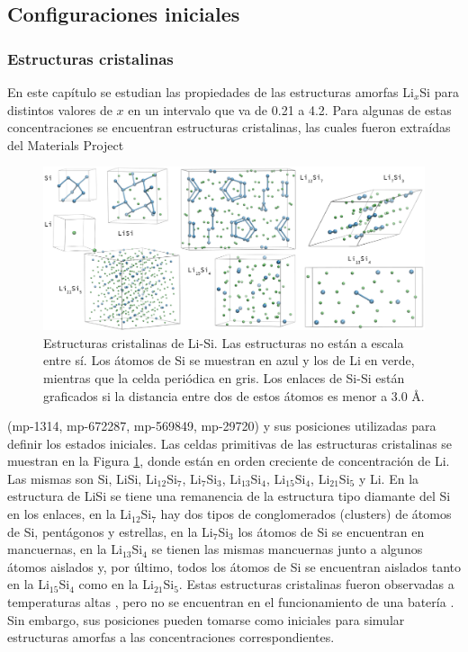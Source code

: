 \subsection{Configuraciones iniciales}

\subsubsection{Estructuras cristalinas}

En este capítulo se estudian las propiedades de las estructuras amorfas Li$_x$Si
para distintos valores de $x$ en un intervalo que va de 0.21 a 4.2. Para algunas de
estas concentraciones se encuentran estructuras cristalinas, las cuales 
fueron extraídas del Materials Project \cite{materials_project} 
\begin{figure}[h!]
    \centering
    \includegraphics[width=\textwidth]{Silicio/caracterizacion/metodos/config/cristalinas.png}
    \caption{Estructuras cristalinas de Li-Si. Las estructuras no están a escala 
    entre sí. Los átomos de Si se muestran en azul y los de Li en verde, mientras
    que la celda periódica en gris. Los enlaces de Si-Si están graficados si la 
    distancia entre dos de estos átomos es menor a 3.0 \AA.}
    \label{fig:cristalinas}
\end{figure}
(mp-1314, mp-672287, mp-569849, mp-29720) y sus posiciones utilizadas para definir
los estados iniciales. Las celdas primitivas de las estructuras cristalinas se
muestran en la Figura \ref{fig:cristalinas}, donde están en orden creciente de 
concentración de Li. Las mismas son Si, LiSi, Li$_{12}$Si$_7$, Li$_7$Si$_3$, 
Li$_{13}$Si$_4$, Li$_{15}$Si$_4$, Li$_{21}$Si$_5$ y Li. En la estructura de LiSi
se tiene una remanencia de la estructura tipo diamante del Si en los enlaces, en la Li$_{12}$Si$_7$ 
hay dos tipos de conglomerados (clusters) de átomos de Si, pentágonos y estrellas, en la
Li$_7$Si$_3$ los átomos de Si se encuentran en mancuernas, en la Li$_{13}$Si$_4$ 
se tienen las mismas mancuernas junto a algunos átomos aislados y, por último, 
todos los átomos de Si se encuentran aislados tanto en la Li$_{15}$Si$_{4}$ como
en la Li$_{21}$Si$_5$. Estas estructuras cristalinas fueron observadas a 
temperaturas altas \cite{wen1981}, pero no se encuentran en el funcionamiento de
una batería \cite{obrovac2004}. Sin embargo, sus posiciones pueden tomarse como 
iniciales para simular estructuras amorfas a las concentraciones correspondientes.

